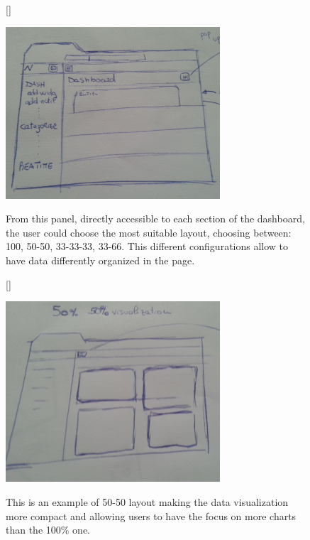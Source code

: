 \documentclass[a4paper,13pt]{report}
\begin{document}
\begin{figure}[H]
[\FBwidth]
{\caption{From this panel, directly accessible to each section of the dashboard, the user could choose the most suitable layout, choosing between: 100, 50-50, 33-33-33, 33-66. This different configurations allow to have data differently organized in the page. }\label{fig:test}}
{\includegraphics[width=8cm]{pics/UISketches/desk1}}
\end{figure}


\begin{figure}[H]
[\FBwidth]
{\caption{This is an example of 50-50 layout making the data visualization more compact and allowing users to have the focus on more charts than the 100\% one.}\label{fig:test}}
{\includegraphics[width=8cm]{pics/UISketches/desk3}}
\end{figure}
\end{document}
